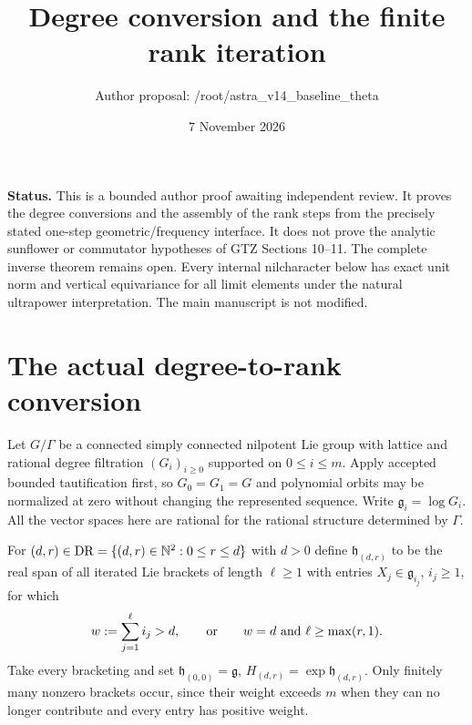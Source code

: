 \documentclass[11pt]{article}
\title{Degree conversion and the finite rank iteration}
\author{Author proposal: /root/astra\_v14\_baseline\_theta}
\date{7 November 2026}
\begin{document}
\maketitle

\noindent\textbf{Status.} This is a bounded author proof awaiting independent
review. It proves the degree conversions and the assembly of the rank
steps from the precisely stated one-step geometric/frequency interface.
It does not prove the analytic sunflower or commutator hypotheses of
GTZ Sections 10--11. The complete inverse theorem remains open.
Every internal nilcharacter below has exact unit norm and vertical
equivariance for all limit elements under the natural ultrapower
interpretation. The main manuscript is not modified.

\section{The actual degree-to-rank conversion}

Let $G/\Gamma$ be a connected simply connected nilpotent Lie group with
lattice and rational degree filtration $(G_i)_{i\geq0}$ supported on
$0\leq i\leq m$. Apply accepted bounded tautification first, so
$G_0=G_1=G$ and polynomial orbits may be normalized at zero without
changing the represented sequence. Write $\mathfrak g_i=\log G_i$.
All the vector spaces here are rational for the rational structure
determined by $\Gamma$.

For $(d,r)\in\mathrm{DR}=\{(d,r)\in\mathbb N^2:0\leq r\leq d\}$ with $d>0$ define
$\mathfrak h_{(d,r)}$ to be the real span of all iterated Lie brackets
of length $\ell\geq1$ with entries $X_j\in\mathfrak g_{i_j}$,
$i_j\geq1$, for which
\begin{equation}\label{eq:DR}
 w:=\sum_{j=1}^{\ell}i_j>d,
 \qquad\hbox{or}\qquad
 w=d\ \hbox{and}\ \ell\geq\max(r,1).
\end{equation}
Take every bracketing and set
$\mathfrak h_{(0,0)}=\mathfrak g$, $H_{(d,r)}=\exp\mathfrak h_{(d,r)}$.
Only finitely many nonzero brackets occur, since their weight exceeds
$m$ when they can no longer contribute and every entry has positive
weight.
\end{document}

